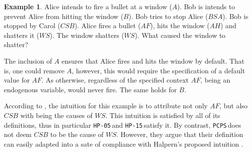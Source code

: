 \documentclass[11pt,a4paper]{book}
\theoremstyle{definition}
\theoremstyle{definition}
\newtheorem{example}{Example}[section]
\theoremstyle{definition}
\theoremstyle{remark}
\newcommand{\hpu}{\texttt{HP-05}\,}
\newcommand{\hpm}{\texttt{HP-15}\,}
\newcommand{\pcps}{\texttt{PCPS}\,}
\begin{document}
\begin{example}
\label{ex:double-preemption-1}
Alice intends to fire a bullet at a window ($A$). 
Bob is intends to prevent Alice from hitting the window ($B$).
Bob tries to stop Alice ($BSA$).
Bob is stopped by Carol ($CSB$). 
Alice fires a bullet ($AF$), hits the window ($AH$) and shatters it ($WS$). 
The window shatters ($WS$). 
What caused the window to shatter?
\begin{center}
\end{center}
The inclusion of $A$ ensures that Alice fires and hits the window by default. That is, one could remove $A$, however, this would require the specification of a default value for $AF$.
As otherwise, regardless of the specified context $AF$, being an endogenous variable, would never fire. 
The same holds for $B$.
\end{example}

According to \parencite[p.~35]{halpern2016actual}, the intuition for this example is to attribute not only $AF$, but also $CSB$ with being the causes of $WS$. 
This intuition is satisfied by all of its definitions, thus in particular \hpu and \hpm satisfy it. By contrast, \pcps does not deem $CSB$ to be the cause of $WS$. 
However, they argue that their definition can easily adapted into a sate of compliance with Halpern's proposed intuition \parencite[p.~36]{denecker2019explaining,halpern2016actual}. 
\end{document}
